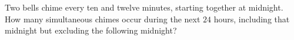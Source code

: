 Two bells chime every ten and twelve minutes, starting together at midnight. How many simultaneous chimes occur during the next $24$ hours, including that midnight but excluding the following midnight?

